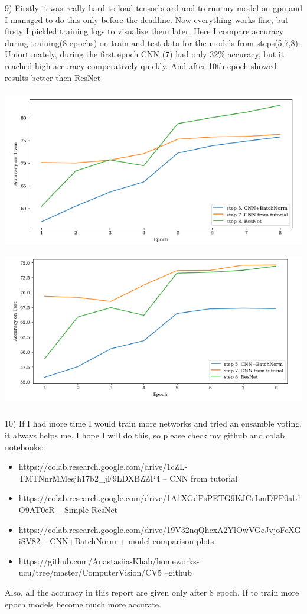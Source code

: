 \documentclass[11pt]{article}
\begin{document}
9) Firstly it was really hard to load tensorboard and to run my model on gpu and I managed to do this only before the deadline. Now everything works fine, but firsty I pickled training logs to visualize them later. Here I compare accuracy during training(8 epochs) on train and test data for the models from steps(5,7,8). Unfortunately, during the first epoch CNN (7) had only 32\% accuracy, but it reached high accuracy comperatively quickly. And after 10th epoch showed results better then ResNet

 \includegraphics[width=\textwidth, height=7cm]{actrain}	
   \includegraphics[width=\textwidth, height=7cm]{actest}
   
10) If I had more time I would train more networks and tried an ensamble voting, it always helps me. I hope I will do this, so please check my github and colab notebooks:

       \begin{itemize}
\item https://colab.research.google.com/drive/1cZL-TMTNnrMMesjh17b2\_jF9LDXBZZP4    -- CNN from tutorial
\item https://colab.research.google.com/drive/1A1XGdPsPETG9KJCrLmDFP0ab1O9AT0eR		-- Simple ResNet
\item https://colab.research.google.com/drive/19V32nqQhcxA2YlOwVGeJvjoFcXGiSV82       -- CNN+BatchNorm + model comparison plots
\item https://github.com/Anastasiia-Khab/homeworks-ucu/tree/master/ComputerVision/CV5    --github
       \end{itemize}

Also, all the accuracy in this report are given only after 8 epoch. If to train more epoch models become much more accurate.
\end{document}
